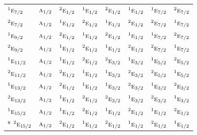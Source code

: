 \documentclass[10pt,a4paper]{article}
\numberwithin{equation}{section}
\newcommand{\irr}[1]{\text{\normalfont\scshape #1}}
\newcommand{\conjpair}[1]{{}^{#1}}
\begin{document}
{\begin{longtable}{@{}lccccccc@{}}
$\conjpair{1}\irr{e}_{7/2}$ & $\irr{a}_{1/2}$ & $\conjpair{2}\irr{e}_{1/2}$ & $\conjpair{1}\irr{e}_{1/2}$ & $\conjpair{2}\irr{e}_{1/2}$ & $\conjpair{1}\irr{e}_{1/2}$ & $\conjpair{1}\irr{e}_{7/2}$ & $\conjpair{2}\irr{e}_{7/2}$\\
$\conjpair{2}\irr{e}_{7/2}$ & $\irr{a}_{1/2}$ & $\conjpair{1}\irr{e}_{1/2}$ & $\conjpair{2}\irr{e}_{1/2}$ & $\conjpair{1}\irr{e}_{1/2}$ & $\conjpair{2}\irr{e}_{1/2}$ & $\conjpair{2}\irr{e}_{7/2}$ & $\conjpair{1}\irr{e}_{7/2}$\\
$\conjpair{1}\irr{e}_{9/2}$ & $\irr{a}_{1/2}$ & $\conjpair{2}\irr{e}_{1/2}$ & $\conjpair{1}\irr{e}_{1/2}$ & $\conjpair{2}\irr{e}_{1/2}$ & $\conjpair{1}\irr{e}_{1/2}$ & $\conjpair{1}\irr{e}_{7/2}$ & $\conjpair{2}\irr{e}_{7/2}$\\
$\conjpair{2}\irr{e}_{9/2}$ & $\irr{a}_{1/2}$ & $\conjpair{1}\irr{e}_{1/2}$ & $\conjpair{2}\irr{e}_{1/2}$ & $\conjpair{1}\irr{e}_{1/2}$ & $\conjpair{2}\irr{e}_{1/2}$ & $\conjpair{2}\irr{e}_{7/2}$ & $\conjpair{1}\irr{e}_{7/2}$\\
$\conjpair{1}\irr{e}_{11/2}$ & $\irr{a}_{1/2}$ & $\conjpair{1}\irr{e}_{1/2}$ & $\conjpair{2}\irr{e}_{1/2}$ & $\conjpair{2}\irr{e}_{3/2}$ & $\conjpair{1}\irr{e}_{3/2}$ & $\conjpair{1}\irr{e}_{5/2}$ & $\conjpair{2}\irr{e}_{5/2}$\\
$\conjpair{2}\irr{e}_{11/2}$ & $\irr{a}_{1/2}$ & $\conjpair{2}\irr{e}_{1/2}$ & $\conjpair{1}\irr{e}_{1/2}$ & $\conjpair{1}\irr{e}_{3/2}$ & $\conjpair{2}\irr{e}_{3/2}$ & $\conjpair{2}\irr{e}_{5/2}$ & $\conjpair{1}\irr{e}_{5/2}$\\
$\conjpair{1}\irr{e}_{13/2}$ & $\irr{a}_{1/2}$ & $\conjpair{2}\irr{e}_{1/2}$ & $\conjpair{1}\irr{e}_{1/2}$ & $\conjpair{1}\irr{e}_{3/2}$ & $\conjpair{2}\irr{e}_{3/2}$ & $\conjpair{1}\irr{e}_{3/2}$ & $\conjpair{2}\irr{e}_{3/2}$\\
$\conjpair{2}\irr{e}_{13/2}$ & $\irr{a}_{1/2}$ & $\conjpair{1}\irr{e}_{1/2}$ & $\conjpair{2}\irr{e}_{1/2}$ & $\conjpair{2}\irr{e}_{3/2}$ & $\conjpair{1}\irr{e}_{3/2}$ & $\conjpair{2}\irr{e}_{3/2}$ & $\conjpair{1}\irr{e}_{3/2}$\\
$\conjpair{1}\irr{e}_{15/2}$ & $\irr{a}_{1/2}$ & $\conjpair{1}\irr{e}_{1/2}$ & $\conjpair{2}\irr{e}_{1/2}$ & $\conjpair{1}\irr{e}_{1/2}$ & $\conjpair{2}\irr{e}_{1/2}$ & $\conjpair{1}\irr{e}_{1/2}$ & $\conjpair{2}\irr{e}_{1/2}$\\*
$\conjpair{2}\irr{e}_{15/2}$ & $\irr{a}_{1/2}$ & $\conjpair{2}\irr{e}_{1/2}$ & $\conjpair{1}\irr{e}_{1/2}$ & $\conjpair{2}\irr{e}_{1/2}$ & $\conjpair{1}\irr{e}_{1/2}$ & $\conjpair{2}\irr{e}_{1/2}$ & $\conjpair{1}\irr{e}_{1/2}$\\
\bottomrule\end{longtable}}
\end{document}
